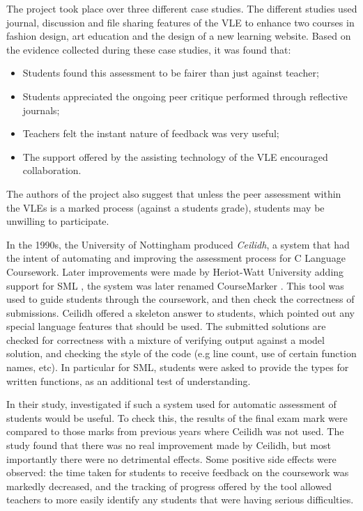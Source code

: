 \documentclass[sigplan,10pt,review]{acmart}\settopmatter{printfolios=true}
\begin{document}
The project took place over three different case studies. The
different studies used journal, discussion and file sharing features
of the \ac{VLE} to enhance two courses in fashion design, art education
and the design of a new learning website. Based on the evidence
collected during these case studies, it was found that:
\begin{itemize}
\item Students found this assessment to be fairer than just against
  teacher;
\item Students appreciated the ongoing peer critique performed through
  reflective journals;
\item Teachers felt the instant nature of feedback was very useful;
\item The support offered by the assisting technology of the \ac{VLE}
  encouraged collaboration.
\end{itemize}
The authors of the project also suggest that unless the peer
assessment within the \acp{VLE} is a marked process (against a
students grade), students may be unwilling to participate.




In the 1990s, the University of Nottingham produced \emph{Ceilidh}, a
system that had the intent of automating and improving the assessment
process for C Language Coursework. Later improvements were made by
Heriot-Watt University adding support for \ac{SML}
\cite{foubister_automatic_1997}, the system was later renamed
CourseMarker \cite{higgins_coursemarker_2003}. This tool was used to
guide students through the coursework, and then check the correctness
of submissions. Ceilidh offered a skeleton answer to students, which
pointed out any special language features that should be used. The
submitted solutions are checked for correctness with a mixture of
verifying output against a model solution, and checking the style of
the code (e.g line count, use of certain function names, etc).  In
particular for \ac{SML}, students were asked to provide the types for
written functions, as an additional test of understanding.

In their study, \citet{foubister_automatic_1997}
investigated if such a system used for automatic assessment of
students would be useful. To check this, the results of the final exam
mark were compared to those marks from previous years where Ceilidh
was not used. The study found that there was no real improvement made
by Ceilidh, but most importantly there were no detrimental
effects. Some positive side effects were observed: the time taken for
students to receive feedback on the coursework was markedly decreased,
and the tracking of progress offered by the tool allowed teachers to
more easily identify any students that were having serious
difficulties.
\end{document}
